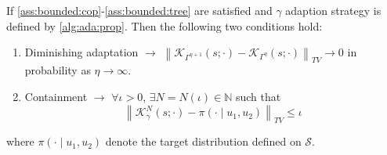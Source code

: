\documentclass[
12pt]{article}
\newenvironment{manualtheorem}[1]{%
	\IfBlankTF{#1}
	{\renewcommand{\themanualtheoreminner}{\unskip}}
	{\renewcommand\themanualtheoreminner{#1}}%
	\manualtheoreminner
}{\endmanualtheoreminner}
\begin{document}
\begin{manualtheorem}{4.1}
	If \cref{ass:bounded:cop}-\cref{ass:bounded:tree} are satisfied and $\gamma$ adaption strategy is defined by \cref{alg:ada:prop}. Then the following two conditions hold:
	\begin{enumerate}
		\item Diminishing adaptation $\rightarrow$ $\left\|\mathcal{K}_{\Gamma^{\eta+1}}(s;\cdot)-\mathcal{K}_{\Gamma^{\eta}}(s;\cdot)\right\|_{TV}\to 0$ in probability as $\eta\to \infty$.
		\item Containment $\rightarrow$ $\forall\iota>0$, $\exists N = N(\iota)\in \mathbb{N}$ such that 
		\begin{equation*}
			\left\|\mathcal{K}^N_{\gamma}(s;\cdot) - \pi(\cdot\mid u_1,u_2)\right\|_{TV} \le \iota
		\end{equation*}
	\end{enumerate}
	where $\pi(\cdot\mid u_1, u_2)$ denote the target distribution defined on $\mathcal{S}$.
\end{manualtheorem}
\end{document}
